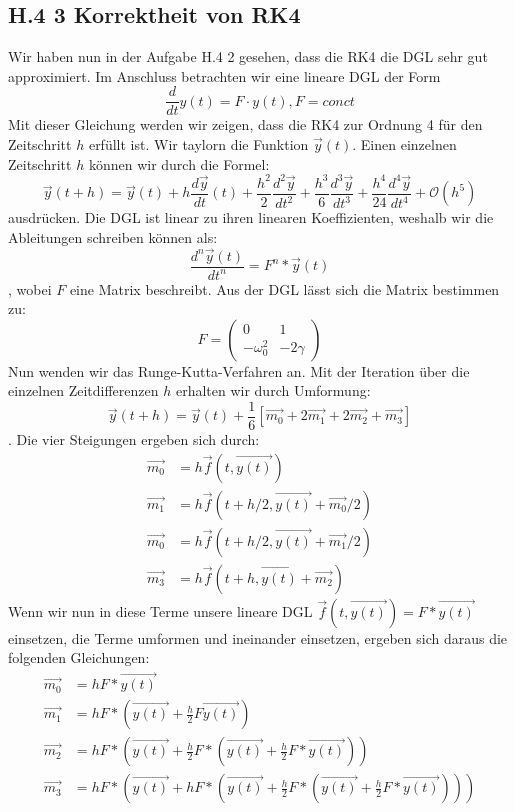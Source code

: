 \documentclass[ngerman]{scrartcl}
\begin{document}
\subsection{H.4 3 Korrektheit von RK4}
Wir haben nun in der Aufgabe H.4 2 gesehen, dass die RK4 die DGL sehr gut approximiert. Im Anschluss betrachten wir eine lineare DGL der Form
\begin{equation}
\frac{d}{dt}y(t)=F \cdot y(t) , F=conct
\end{equation}
Mit dieser Gleichung werden wir zeigen, dass die RK4 zur Ordnung 4 für den Zeitschritt $h$ erfüllt ist. Wir taylorn die Funktion $\vec{y}(t)$. Einen einzelnen Zeitschritt $h$ können wir durch die Formel: 
\begin{equation} \vec{y}(t+h) = \vec{y}(t) + h\frac{d\vec{y}}{dt}(t) + \frac{h^2}{2}\frac{d^2\vec{y}}{dt^2} + \frac{h^3}{6}\frac{d^3\vec{y}}{dt^3} + \frac{h^4}{24}\frac{d^4\vec{y}}{dt^4} + \mathcal{O}(h^5) \end{equation} ausdrücken. Die DGL ist linear zu ihren linearen Koeffizienten, weshalb wir die Ableitungen schreiben können als:
\begin{equation*} \frac{d^n\vec{y}(t)}{dt^n} = F^n*\vec{y}(t) \end{equation*}, wobei $F$ eine Matrix beschreibt. Aus der DGL lässt sich die Matrix bestimmen zu: \begin{equation*} F = \begin{pmatrix} 0 & 1 \\ -\omega_0^2 & -2\gamma \end{pmatrix} \end{equation*}
Nun wenden wir das Runge-Kutta-Verfahren an. Mit der Iteration über die einzelnen Zeitdifferenzen $h$ erhalten wir durch Umformung: \begin{equation} \vec{y}(t+h) = \vec{y}(t) + \frac{1}{6}[\vec{m_0} + 2\vec{m_1} + 2\vec{m_2} + \vec{m_3}] \end{equation}. Die vier Steigungen ergeben sich durch: 
\begin{align*} \vec{m_0} &= h\vec{f}(t, \vec{y(t)}) \\  \vec{m_1} &= h\vec{f}(t+h/2, \vec{y(t)}+\vec{m_0}/2) \\  \vec{m_0} &= h\vec{f}(t+h/2, \vec{y(t)}+\vec{m_1}/2) \\  \vec{m_3} &= h\vec{f}(t+h , \vec{y(t)} + \vec{m_2}) \end{align*}
Wenn wir nun in diese Terme unsere lineare DGL $\vec{f}(t, \vec{y(t)}) = F*\vec{y(t)}$ einsetzen, die Terme umformen und ineinander einsetzen, ergeben sich daraus die folgenden Gleichungen: \begin{align}  \vec{m_0} &= hF*\vec{y(t)} \\  \vec{m_1} &= hF*\left(\vec{y(t)} + \frac{h}{2}F\vec{y(t)}\right) \\  \vec{m_2} &= hF*\left(\vec{y(t)} + \frac{h}{2}F*\left(\vec{y(t)} + \frac{h}{2}F*\vec{y(t)}\right)\right) \\  \vec{m_3} &= hF*\left(\vec{y(t)} + hF*\left(\vec{y(t)}+\frac{h}{2}F*\left(\vec{y(t)} + \frac{h}{2}F*\vec{y(t)}\right)\right)\right) \end{align}
\end{document}
